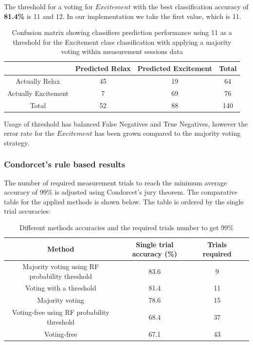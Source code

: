 \documentclass[12pt]{article}
\begin{document}
The threshold for a voting for $Excitement$ with the best classification accuracy of \textbf{81.4\%} is 11 and 12. In our implementation we take the first value, which is 11.

\begin{table}[H]
\caption{Confusion matrix showing classifiers prediction performance using 11 as a threshold for the Excitement class classification with applying a majority voting within measurement sessions data} \label{tab:title} 
\begin{center}
  \begin{tabular}{ | c | c | c | c | }
    \hline
     & Predicted Relax & Predicted Excitement & Total \\ \hline
    Actually Relax & 45 & 19 & 64 \\ \hline
    Actually Excitement & 7 & 69 & 76 \\ \hline
    Total & 52 & 88 & 140 \\ 
    \hline
  \end{tabular}
\end{center}
\end{table}

Usage of threshold has balanced False Negatives and True Negatives, however the error rate for the $Excitement$ has been grown compared to the majority voting strategy.


\subsubsection{Condorcet's rule based results}\label{condorcet1}
The number of required measurement trials to reach the minimum average accuracy of 99\% is adjusted using Condorcet's jury theorem. The comparative table for the applied methods is shown below. The table is ordered by the single trial accuracies:

\begin{table}[H]
\caption{Different methods accuracies and the required trials number to get 99\%} \label{tab:title} 
\begin{center}
  \begin{tabular}{ | c | c | c | c | }
    \hline
    Method & \parbox[c]{1.8cm}{\raggedright Single trial accuracy (\%)} & Trials required\\ \hline
    Majority voting using RF probability threshold & 83.6 & 9 \\ \hline
    Voting with a threshold & 81.4 & 11 \\ \hline
	Majority voting & 78.6 & 15 \\ \hline
    Voting-free using RF probability threshold & 68.4 & 37\\ \hline
    Voting-free & 67.1 & 43\\ \hline
  \end{tabular}
\end{center}
\end{table}
\end{document}
